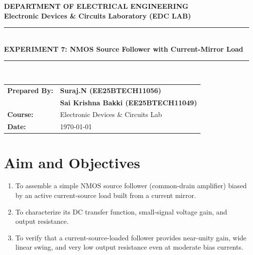 \documentclass[11pt,a4paper]{article}
\begin{document}
\begin{center}
    {\LARGE \textbf{\color{primary} DEPARTMENT OF ELECTRICAL ENGINEERING}}\\[0.2cm]
    {\large \textbf{Electronic Devices \& Circuits Laboratory (EDC LAB)}}\\[0.4cm]
    \rule{\linewidth}{1pt}\\[0.3cm]
    {\Large \textbf{EXPERIMENT 7: NMOS Source Follower with Current-Mirror Load}}\\[0.3cm]
    \rule{\linewidth}{1pt}\\[0.4cm]
    
    \begin{tabular}{ll}
        \textbf{Prepared By:} & \textbf{Suraj.N (EE25BTECH11056)} \\
                              & \textbf{Sai Krishna Bakki (EE25BTECH11049)} \\
        \textbf{Course:}      & Electronic Devices \& Circuits Lab \\
        \textbf{Date:}        & \today
    \end{tabular}
\end{center}

\vspace{0.2cm}

\section{Aim and Objectives}
\begin{enumerate}
    \item To assemble a simple NMOS source follower (common-drain amplifier) biased by an active current-source load built from a current mirror.
    \item To characterize its DC transfer function, small-signal voltage gain, and output resistance.
    \item To verify that a current-source-loaded follower provides near-unity gain, wide linear swing, and very low output resistance even at moderate bias currents.
\end{enumerate}
\end{document}
